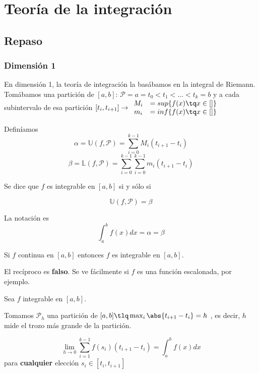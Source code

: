 \section{Teoría de la integración}

\subsection{Repaso}

\subsubsection{Dimensión 1}

En dimensión 1, la teoría de integración la basábamos en la integral de Riemann. Tomábamos una partición de $[a,b]$: $\mathcal{P} = a = t_0 < t_1<...<t_k = b$ y a cada subintervalo de esa partición $[t_i,t_{i+1}] \rightarrow \begin{array}{cc} 
M_i &= sup\{f(x)\tq x\in []\}\\
m_i &= inf \{f(x)\tq x\in []\}\end{array}$ 

Definíamos \[ \alpha = \mathbb{U}(f,\mathcal{P}) = \sum_{i=0}^{k-1} M_i(t_{i+1}-t_i)\]
\[ \beta = \mathbb{L}(f,\mathcal{P}) = \sum_{i=0}^{k-1} \sum_{i=0}^{k-1} m_i(t_{i+1}-t_i)\]

\begin{defn} Se dice que $f$ es integrable en $[a,b]$ si y sólo si 

\[ \mathbb{U}(f,\mathcal{P}) = \beta \] 

La notación es \[ \int_a^b f(x)dx = \alpha = \beta \]
\end{defn}

\begin{theorem}
Si $f$ continua en $[a,b]$ entonces  $f$ es integrable en $[a,b]$.
\end{theorem}

El recíproco es \textbf{falso}. Se ve fácilmente si $f$ es una función escalonada, por ejemplo.

\begin{theorem} Sea $f$ integrable en $[a,b]$.

Tomamos $\mathcal{P}_h$ una partición de $[a,b] \tlq \max_{i} \abs{t_{i+1}-t_i} = h$ , es decir, $h$ mide el trozo más grande de la partición.

\[ \lim_{h\rightarrow 0} \sum_{i=1}^{k-1} f(s_i)(t_{i+1}-t_i) = \int_a^bf(x)dx \] para \textbf{cualquier} elección $s_i\in[t_i,t_{i+1}]$	

\end{theorem} 


